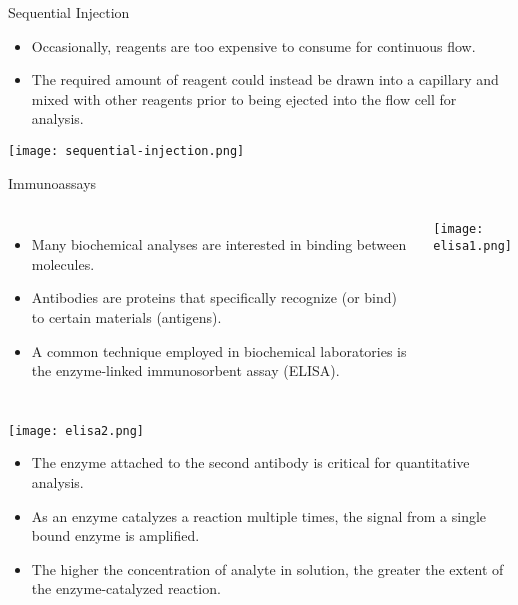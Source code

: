 \documentclass[handout]{beamer}
\begin{document}
\begin{frame}{Sequential Injection}
	\begin{itemize}
		\item Occasionally, reagents are too expensive to consume for
			continuous flow.
		\item The required amount of reagent could instead be drawn into
			a capillary and mixed with other reagents prior to being
			ejected into the flow cell for analysis.
	\end{itemize}

	\begin{center}
		\texttt{[image: sequential-injection.png]}
	\end{center}
\end{frame}

\begin{frame}{Immunoassays}
	\begin{columns}
		\begin{itemize}
			\item Many biochemical analyses are interested in
				binding between molecules.
			\item \alert{Antibodies} are proteins that specifically
				recognize (or bind) to certain materials
				(antigens).
			\item A common technique employed in biochemical
				laboratories is the \alert{enzyme-linked
				immunosorbent assay (ELISA)}.
		\end{itemize}
		\begin{center}
			\texttt{[image: elisa1.png]}
		\end{center}
	\end{columns}
\end{frame}

\begin{frame}
	\begin{center}
		\texttt{[image: elisa2.png]}
	\end{center}
	\begin{itemize}
		\item The enzyme attached to the second antibody is critical for
			\alert{quantitative} analysis.
		\item As an enzyme \alert{catalyzes} a reaction multiple times,
			the signal from a single bound enzyme is
			\alert{amplified}.
		\item The higher the concentration of analyte in solution, the
			greater the extent of the enzyme-catalyzed reaction.
	\end{itemize}

\end{frame}
\end{document}
